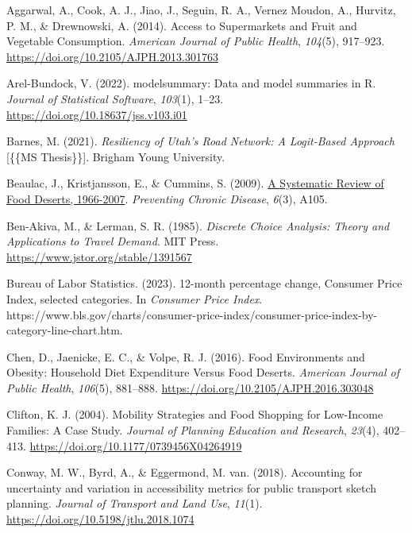 \documentclass[
  letterpaper,
  number,
  review,
  doubleblind,
  3p]{elsarticle}
\newlength{\cslhangindent}
\newenvironment{CSLReferences}[2] %
 {\begin{list}{}{%
  \setlength{\itemindent}{0pt}
  \setlength{\leftmargin}{0pt}
  \setlength{\parsep}{0pt}
  \ifodd #1
   \setlength{\leftmargin}{\cslhangindent}
   \setlength{\itemindent}{-1\cslhangindent}
  \fi
  \setlength{\itemsep}{#2\baselineskip}}}
 {\end{list}}
\begin{document}
\label{refs}
\begin{CSLReferences}{1}{0}
Aggarwal, A., Cook, A. J., Jiao, J., Seguin, R. A., Vernez Moudon, A.,
Hurvitz, P. M., \& Drewnowski, A. (2014). Access to {Supermarkets} and
{Fruit} and {Vegetable Consumption}. \emph{American Journal of Public
Health}, \emph{104}(5), 917--923.
\url{https://doi.org/10.2105/AJPH.2013.301763}

Arel-Bundock, V. (2022). {modelsummary}: Data and model summaries in
{R}. \emph{Journal of Statistical Software}, \emph{103}(1), 1--23.
\url{https://doi.org/10.18637/jss.v103.i01}

Barnes, M. (2021). \emph{Resiliency of {Utah}'s {Road Network}: {A
Logit-Based Approach}} {[}\{\{MS Thesis\}\}{]}. Brigham Young
University.

Beaulac, J., Kristjansson, E., \& Cummins, S. (2009).
\href{https://www.ncbi.nlm.nih.gov/pmc/articles/PMC2722409}{A
{Systematic Review} of {Food Deserts}, 1966-2007}. \emph{Preventing
Chronic Disease}, \emph{6}(3), A105.

Ben-Akiva, M., \& Lerman, S. R. (1985). \emph{Discrete {Choice
Analysis}: {Theory} and {Applications} to {Travel Demand}}. MIT Press.
\url{https://www.jstor.org/stable/1391567}

Bureau of Labor Statistics. (2023). 12-month percentage change,
{Consumer Price Index}, selected categories. In \emph{Consumer Price
Index}.
https://www.bls.gov/charts/consumer-price-index/consumer-price-index-by-category-line-chart.htm.

Chen, D., Jaenicke, E. C., \& Volpe, R. J. (2016). Food {Environments}
and {Obesity}: {Household Diet Expenditure Versus Food Deserts}.
\emph{American Journal of Public Health}, \emph{106}(5), 881--888.
\url{https://doi.org/10.2105/AJPH.2016.303048}

Clifton, K. J. (2004). Mobility {Strategies} and {Food Shopping} for
{Low-Income Families}: {A Case Study}. \emph{Journal of Planning
Education and Research}, \emph{23}(4), 402--413.
\url{https://doi.org/10.1177/0739456X04264919}

Conway, M. W., Byrd, A., \& Eggermond, M. van. (2018). Accounting for
uncertainty and variation in accessibility metrics for public transport
sketch planning. \emph{Journal of Transport and Land Use}, \emph{11}(1).
\url{https://doi.org/10.5198/jtlu.2018.1074}


\end{CSLReferences}
\end{document}
